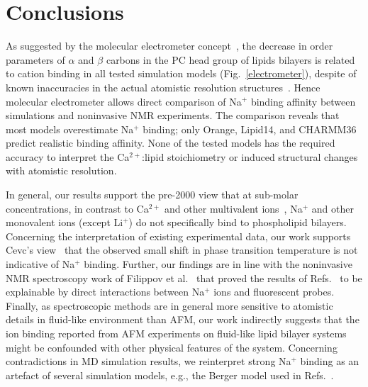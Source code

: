 \documentclass[twoside,twocolumn,9pt]{article}
\begin{document}
\section{Conclusions}
As suggested by the molecular electrometer concept~\cite{akutsu81,altenbach84,seelig87,scherer89},
the decrease in order parameters of $\alpha$ and $\beta$ carbons in the PC head group of lipids bilayers
is related to cation binding  in all tested simulation models (Fig.~\ref{electrometer}), despite of known inaccuracies 
in the actual atomistic resolution structures~\cite{botan15}. Hence molecular electrometer allows direct comparison
of Na$^+$ binding affinity between simulations and noninvasive NMR experiments.
The comparison reveals that most models overestimate Na$^+$ binding; only Orange, Lipid14, and CHARMM36 
predict realistic binding affinity. None of the tested models has the required accuracy to interpret
the Ca$^{2+}$:lipid stoichiometry or induced structural changes with atomistic resolution.

In general, our results support the pre-2000 view that at sub-molar concentrations, in contrast to Ca$^{2+}$ and other multivalent ions~\cite{eisenberg79,akutsu81,altenbach84,tatulian87,cevc90,tocanne90,clarke99,binder02,pabst07,filippov09},
Na$^+$ and other monovalent ions (except Li$^+$) do not specifically bind to phospholipid bilayers.
Concerning the interpretation of existing experimental data, our work supports Cevc's view~\cite{cevc90}
that the observed small shift in phase transition temperature is not indicative of Na$^+$ binding.
Further, our findings are in line with the noninvasive NMR spectroscopy work of Filippov et al.~\cite{filippov09} 
that proved the results of Refs.~ to be explainable by direct interactions between Na$^+$ ions and fluorescent probes.
Finally, as spectroscopic methods are in general more sensitive to atomistic details in fluid-like environment than AFM, our work indirectly suggests that the ion 
binding reported from AFM experiments on fluid-like lipid bilayer systems~\cite{manyes05,manyes06,fukuma07,ferber11,morata12} might be confounded with other physical features of the system.
Concerning contradictions in MD simulation results, we reinterpret strong Na$^+$ binding as an artefact of several simulation models, e.g., the Berger model used in Refs.~.
\end{document}
